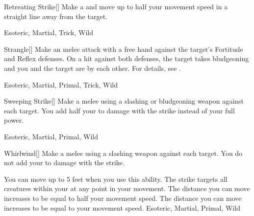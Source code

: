 \lowercase{\hypertarget{maneuver:Retreating Strike}{}}\label{maneuver:Retreating Strike}
\hypertarget{maneuver:Retreating Strike}{}
\begin{freeability}[Rank 1]{Retreating Strike}[]
Make a  and move up to half your movement speed in a straight line away from the target.


 Esoteric, Martial, Trick, Wild
\end{freeability}
\vspace{0.25em}



\lowercase{\hypertarget{maneuver:Strangle}{}}\label{maneuver:Strangle}
\hypertarget{maneuver:Strangle}{}
\begin{freeability}[Rank 1]{Strangle}[]
Make an melee attack with a free hand against the target's Fortitude and Reflex defenses.
On a hit against both defenses, the target takes bludgeoning  and you and the target are  by each other.
For details, see .


 Esoteric, Martial, Primal, Trick, Wild
\end{freeability}
\vspace{0.25em}



\lowercase{\hypertarget{maneuver:Sweeping Strike}{}}\label{maneuver:Sweeping Strike}
\hypertarget{maneuver:Sweeping Strike}{}
\begin{freeability}[Rank 1]{Sweeping Strike}[]
Make a melee  using a slashing or bludgeoning weapon against each target.
You add half your  to damage with the strike instead of your full power.


 Esoteric, Martial, Primal, Wild
\end{freeability}
\vspace{0.25em}



\lowercase{\hypertarget{maneuver:Whirlwind}{}}\label{maneuver:Whirlwind}
\hypertarget{maneuver:Whirlwind}{}
\begin{freeability}[Rank 1]{Whirlwind}[]
Make a melee  using a slashing weapon against each target.
You do not add your  to damage with the strike.

\rankline
{} You can move up to 5 feet when you use this ability.
The strike targets all creatures within your  at any point in your movement.
 The distance you can move increases to be equal to half your movement speed.
 The distance you can move increases to be equal to your movement speed.
 Esoteric, Martial, Primal, Wild
\end{freeability}
\vspace{0.25em}


